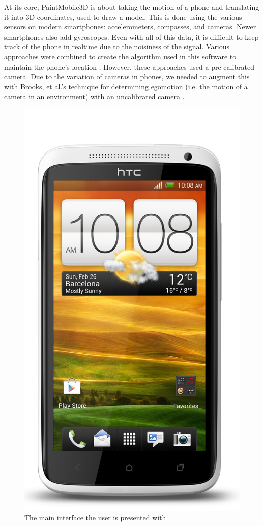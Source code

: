 \documentclass{chi-ext}
\begin{document}
At its core, PaintMobile3D is about taking the motion of a phone and translating it into 3D coordinates, used to draw a model.
This is done using the various sensors on modern smartphones: accelerometers, compasses, and cameras. Newer smartphones
also add gyroscopes. Even with all of this data, it is difficult to keep track of the phone in realtime due to the noisiness of the signal.
Various approaches were combined to create the algorithm used in this software to maintain the phone's location \cite{voigt2011robust} \cite{hol2007robust}.
However, these approaches used a pre-calibrated camera. Due to the variation of cameras in phones, we needed to augment this with
Brooks, et al.'s technique for determining egomotion (i.e. the motion of a camera in an environment) with an uncalibrated
camera \cite{brooks1997determining}.

\pagebreak

\begin{figure}
\parbox{1\columnwidth}{

  \centering
  \includegraphics[width=0.8\columnwidth]{onex.jpg}
  \caption{The main interface the user is presented with}
  \label{fig:maininterface}
}
\end{figure}
\end{document}
